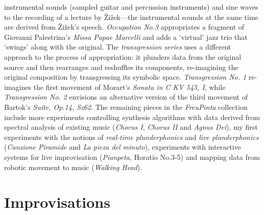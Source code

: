 instrumental sounds (sampled guitar and percussion instruments) and sine waves to the recording of a lecture by \v{Z}i\v{z}ek---the instrumental sounds at the same time are derived from \v{Z}i\v{z}ek's speech. \emph{Occupation No.3} appropriates a fragment of Giovanni Palestrina's \emph{Missa Papae Marcelli} and adds a `virtual' jazz trio that `swings' along with the original. The \emph{transgression series} uses a different approach to the process of appropriation: it plunders data from the original source and then rearranges and reshuffles its components, re-imagining the original composition by transgressing its symbolic space. \emph{Transgression No. 1} re-imagines the first movement of Mozart's \emph{Sonata in C KV 545, I}, while \emph{Transgression No. 2} envisions an alternative version of the third movement of Bartok's \emph{Suite, Op.14, Sz62}. The remaining pieces in the \emph{FreuPinta} collection include more experiments controlling synthesis algorithms with data derived from spectral analysis of existing music (\emph{Chorus I}, \emph{Chorus II} and \emph{Agnus Dei}), my first experiments with the notions of \emph{real-time plunderphonics} and \emph{live plunderphonics} (\emph{Canzione Piramide} and \emph{La pieza del minuto}), experiments with interactive systems for live improvisation (\emph{Pianpeta}, Horatio No.3-5) and mapping data from robotic movement to music (\emph{Walking Head}).

\section{Improvisations}

